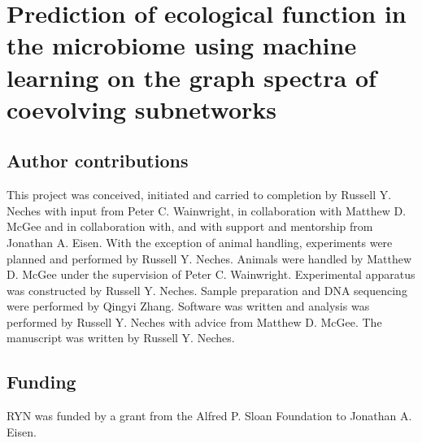 

\chapter{Prediction of ecological function in the microbiome using machine learning on the graph spectra of coevolving subnetworks}


\section{Author contributions}

This project was conceived, initiated and carried to completion by Russell Y. Neches with input from Peter C. Wainwright, in collaboration with Matthew D. McGee and in collaboration with, and with support and mentorship from Jonathan A. Eisen. With the exception of animal handling, experiments were planned and performed by Russell Y. Neches. Animals were handled by Matthew D. McGee under the supervision of Peter C. Wainwright. Experimental apparatus was constructed by Russell Y. Neches. Sample preparation and DNA sequencing were performed by Qingyi Zhang. Software was written and analysis was performed by Russell Y. Neches with advice from Matthew D. McGee. The manuscript was written by Russell Y. Neches.









\section{Funding}

RYN was funded by a grant from the Alfred P. Sloan Foundation to Jonathan A. Eisen. 

\printbibliography[heading=subbibliography]




